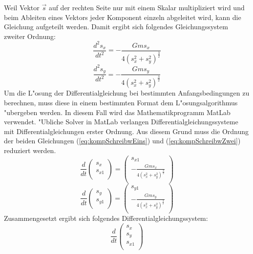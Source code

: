 \begin{refsection}
Weil Vektor $\vec{s}$ auf der rechten Seite nur mit einem Skalar multipliziert wird und beim Ableiten eines Vektors jeder Komponent einzeln abgeleitet wird, kann die Gleichung aufgeteilt werden.
Damit ergibt sich folgendes Gleichungssystem zweiter Ordnung:
\begin{equation} \label{eq:kompSchreibwEins}
\frac{d^2s_x}{dt^2}=-\frac{G m s_x}{4(s_x^2 + s_y^2)^\frac32}
\end{equation}
\begin{equation} \label{eq:kompSchreibwZwei}
\frac{d^2s_y}{dt^2}=-\frac{G m s_y}{4(s_x^2 + s_y^2)^\frac32}
\end{equation}
Um die L"osung der Differentialgleichung bei bestimmten Anfangsbedingungen zu berechnen, muss diese in einem bestimmten Format dem L"osungsalgorithmus "ubergeben werden.
In diesem Fall wird das Mathematikprogramm MatLab verwendet. 
"Ubliche Solver in MatLab verlangen Differentialgleichungssysteme mit Differentialgleichungen erster Ordnung.
Aus diesem Grund muss die Ordnung der beiden Gleichungen (\ref{eq:kompSchreibwEins}) und (\ref{eq:kompSchreibwZwei}) reduziert werden. 
\begin{equation}
\frac{d}{dt} \begin{pmatrix}
s_x \\ 
s_{x1}\\
\end{pmatrix} = \begin{pmatrix}
s_{x1} \\ 
-\frac{G m s_x}{4(s_x^2 + s_y^2)^\frac32} \\
\end{pmatrix}
\end{equation}
\begin{equation}
\frac{d}{dt} \begin{pmatrix}
s_y \\ 
s_{y1}\\
\end{pmatrix} = \begin{pmatrix}
s_{y1} \\ 
-\frac{G m s_y}{4(s_x^2 + s_y^2)^\frac32} \\
\end{pmatrix}
\end{equation}
Zusammengesetzt ergibt sich folgendes Differentialgleichungssystem:
\begin{equation}
\frac{d}{dt} \begin{pmatrix}
s_x \\ 
s_y \\
s_{x1}\\

\end{pmatrix}
\end{equation}
\end{refsection}
